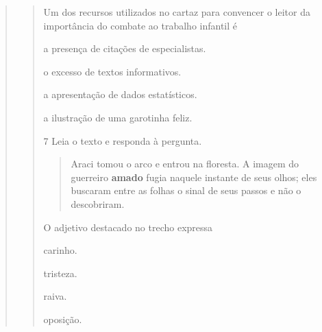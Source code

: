 \begin{escolha}
\begin{escolha}
\begin{escolha}
\begin{quote}
\begin{quote}
{Um dos recursos utilizados no cartaz para convencer o leitor da
importância do combate ao trabalho infantil é

\begin{escolha}
  \item a presença de citações de especialistas.

  \item o excesso de textos informativos.

  \item a apresentação de dados estatísticos.

  \item a ilustração de uma garotinha feliz.
\end{escolha}


\num{7} Leia o texto e responda à pergunta.

\begin{quote}
Araci tomou o arco e entrou na floresta. A imagem do guerreiro
\textbf{amado} fugia naquele instante de seus olhos; eles buscaram entre as
folhas o sinal de seus passos e não o descobriram.
\end{quote}


O adjetivo destacado no trecho expressa

\begin{escolha}
  \item carinho.

  \item tristeza.

  \item raiva.

  \item oposição.
\end{escolha}

}
\end{quote}
\end{quote}
\end{escolha}
\end{escolha}
\end{escolha}
